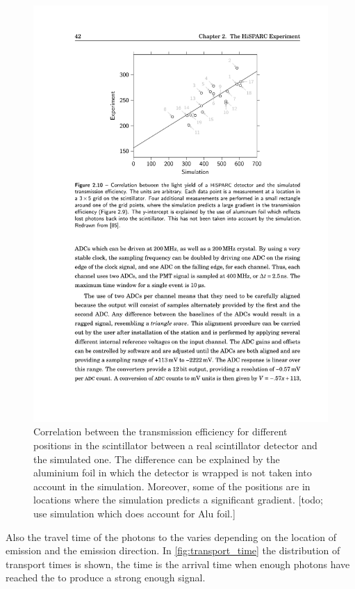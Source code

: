 \begin{figure}
    \centering
    \includegraphics{plots/station/scintilator_transmission_compared}
    \caption{Correlation between the transmission efficiency for different positions in the scintillator between a real scintillator detector and the simulated one. The difference can be explained by the aluminium foil in which the detector is wrapped is not taken into account in the simulation. Moreover, some of the positions are in locations where the simulation predicts a significant gradient. [todo; use simulation which does account for Alu foil.]}
    \label{fig:scintilator_transmission_compared}
\end{figure}

Also the travel time of the photons to the \pmt varies depending on the location of emission and the emission direction. In \cref{fig:transport_time} the distribution of transport times is shown, the time is the arrival time when enough photons have reached the \pmt to produce a strong enough signal.

